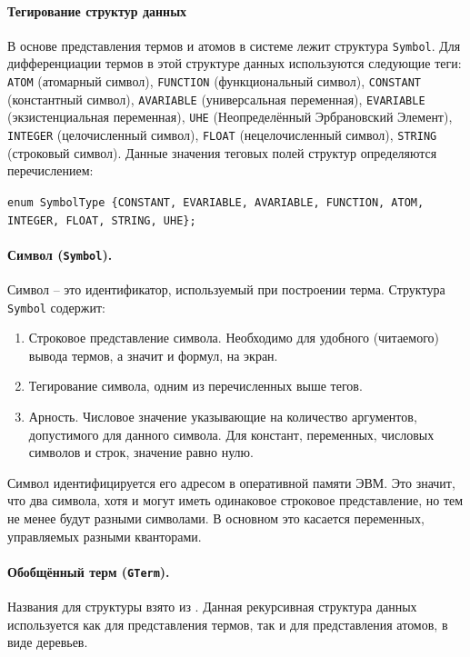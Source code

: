 
\paragraph{Тегирование структур данных}
В основе представления термов и атомов в системе лежит структура \texttt{Symbol}. %
Для дифференциации термов в этой структуре данных используются следующие теги: \texttt{ATOM} (атомарный символ), \texttt{FUNCTION} (функциональный символ), \texttt{CONSTANT} (константный символ), \texttt{AVARIABLE} (универсальная переменная), \texttt{EVARIABLE} (экзистенциальная переменная), \texttt{UHE} (Неопределённый Эрбрановский Элемент), \texttt{INTEGER} (целочисленный символ), \texttt{FLOAT} (нецелочисленный символ), \texttt{STRING} (строковый символ). Данные значения теговых полей структур определяются перечислением:

{\tt enum SymbolType \{CONSTANT, EVARIABLE, AVARIABLE, FUNCTION, ATOM, INTEGER, FLOAT, STRING, UHE\};}

\paragraph{Символ (\texttt{Symbol}).}
Символ -- это идентификатор, используемый при построении терма. Структура \texttt{Symbol} содержит:
\begin{enumerate}
\item Строковое представление символа. Необходимо для удобного (читаемого) вывода термов, а значит и формул, на экран.
\item Тегирование символа, одним из перечисленных выше тегов.
\item Арность. Числовое значение указывающие на количество аргументов, допустимого для данного символа. Для констант, переменных, числовых символов и строк, значение равно нулю.
\end{enumerate}

Символ идентифицируется его адресом в оперативной памяти ЭВМ. Это значит, что два символа, хотя и могут иметь одинаковое строковое представление, но тем не менее будут разными символами. В основном это касается переменных, управляемых разными кванторами.

\paragraph{Обобщённый терм (\texttt{GTerm}).}
Названия для структуры взято из \cite{NNN}. Данная рекурсивная структура данных используется как для представления термов, так и для представления атомов, в виде деревьев.

